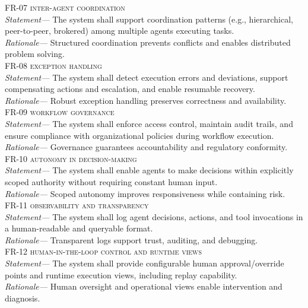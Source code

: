 \begin{footnotesize}
  \noindent \textsc{FR-07 inter-agent coordination} \\
  \indent \emph{Statement—} The system shall support coordination patterns (e.g., hierarchical, peer-to-peer, brokered) among multiple agents executing tasks. \\
  \indent \emph{Rationale—} Structured coordination prevents conflicts and enables distributed problem solving. \\

  \noindent \textsc{FR-08 exception handling} \\
  \indent \emph{Statement—} The system shall detect execution errors and deviations, support compensating actions and escalation, and enable resumable recovery. \\
  \indent \emph{Rationale—} Robust exception handling preserves correctness and availability. \\

  \noindent \textsc{FR-09 workflow governance} \\
  \indent \emph{Statement—} The system shall enforce access control, maintain audit trails, and ensure compliance with organizational policies during workflow execution. \\
  \indent \emph{Rationale—} Governance guarantees accountability and regulatory conformity. \\

  \noindent \textsc{FR-10 autonomy in decision-making} \\
  \indent \emph{Statement—} The system shall enable agents to make decisions within explicitly scoped authority without requiring constant human input. \\
  \indent \emph{Rationale—} Scoped autonomy improves responsiveness while containing risk. \\

  \noindent \textsc{FR-11 observability and transparency} \\
  \indent \emph{Statement—} The system shall log agent decisions, actions, and tool invocations in a human-readable and queryable format. \\
  \indent \emph{Rationale—} Transparent logs support trust, auditing, and debugging. \\

  \noindent \textsc{FR-12 human-in-the-loop control and runtime views} \\
  \indent \emph{Statement—} The system shall provide configurable human approval/override points and runtime execution views, including replay capability. \\
  \indent \emph{Rationale—} Human oversight and operational views enable intervention and diagnosis. \\


\end{footnotesize}
